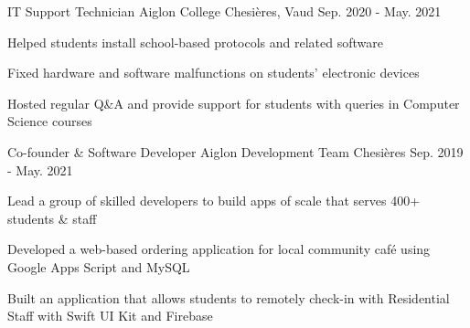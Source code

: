 \begin{cventries}

  \cventry
    {IT Support Technician}
    {Aiglon College}
    {Chesières, Vaud}
    {Sep. 2020 - May. 2021}
    {
      \begin{cvitems}
        \item {Helped students install school-based protocols and related software}
        \item {Fixed hardware and software malfunctions on students' electronic devices}
        \item {Hosted regular Q\&A and provide support for students with queries
in Computer Science courses}
      \end{cvitems}
    }

  \cventry
    {Co-founder \& Software Developer}
    {Aiglon Development Team}
    {Chesières}
    {Sep. 2019 - May. 2021}
    {
      \begin{cvitems}
        \item {Lead a group of skilled developers to build apps of scale that serves 400+ students \& staff}
        \item {Developed a web-based ordering application for local community café using Google Apps Script and MySQL}
        \item {Built an application that allows students to remotely check-in with Residential Staff with Swift UI Kit and Firebase}
      \end{cvitems}
    }
\end{cventries}

